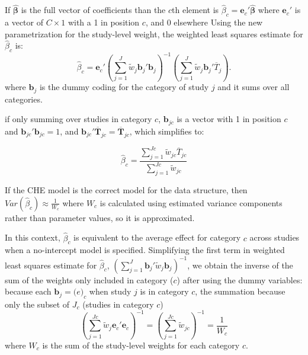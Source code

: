 If $\hat{\bm{\beta}}$ is the full vector of coefficients than the $c$th element is $\hat{\beta}_c  = \bm{e}_c' \hat{\bm{\beta}}$ where $\bm{e}_c' $ is a vector of $C \times 1$ with a 1 in position $c$, and 0 elsewhere Using the new parametrization for the study-level weight, the weighted least squares estimate for $\hat{\beta}_c$ is:
\begin{equation} \label{eq: weighted least squares estimate for beta_c}
    \hat{\beta}_c = \bm{e}_c'\left(\sum_{j=1}^{J} \tilde{w}_{j} \mathbf{b}_{j}'\mathbf{b}_{j}  \right)^{-1} \left(\sum_{j=1}^{J} \tilde{w}_{j} \mathbf{b}_{j}'\overline{T}_{j} \right).
\end{equation}
where $\mathbf{b}_{j}$ is the dummy coding for the category of study $j$ and it sums over all categories. 


if only summing over studies in category $c$, $\mathbf{b}_{jc}$ is a vector with 1 in position $c$ and $\mathbf{b}_{jc}'\mathbf{b}_{jc}=1$, and $\mathbf{b}_{jc}'\overline{\mathbf{T}}_{jc}=\overline{\mathbf{T}}_{jc}$, which simplifies to:

\begin{equation}
    \hat{\beta}_c = \frac{\sum_{j=1}^{Jc}\tilde{w}_{jc} \overline{T}_{jc}}{\sum_{j=1}^{Jc}\tilde{w}_{jc}}
\end{equation}





If the CHE model is the correct model for the data structure, then $Var(\hat{\beta}_c) \approx \frac{1}{W_c}$ where $W_c$ is calculated using estimated variance components rather than parameter values, so it is approximated. 

In this context, $\hat{\beta}_c$ is equivalent to the average effect for category $c$ across studies when a no-intercept model is specified. 
Simplifying the first term in weighted least squares estimate for $\hat{\beta}_c$, $\left(\sum_{j=1}^{J}\mathbf{b}_{j}'\tilde{w}_{j} \mathbf{b}_{j} \right)^{-1}$, we obtain the inverse of the sum of the weights only included in category ($c$) after using the dummy variables:
because each $\mathbf{b}_j = \bm(e)_c$ when study $j$ is in category $c$, the summation because only the subset of $J_c$ (studies in category $c$)
\begin{equation}
    \left(\sum_{j=1}^{Jc}\tilde{w}_{j}\mathbf{e}_{c}' \mathbf{e}_{c} \right)^{-1} = \left(\sum_{j=1}^{Jc}\tilde{w}_{jc}  \right)^{-1} = \frac{1}{W_c}
    \nonumber
\end{equation}
where  $W_c$ is the sum of the study-level weights for each category $c$.

